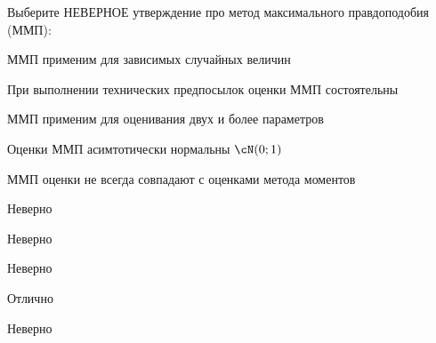 
\begin{question}
Выберите НЕВЕРНОЕ утверждение про метод максимального правдоподобия
(ММП):
\begin{answerlist}
  \item ММП применим для зависимых случайных величин
  \item При выполнении технических предпосылок оценки ММП состоятельны
  \item ММП применим для оценивания двух и более параметров
  \item Оценки ММП асимтотически нормальны \(\cN(0;1)\)
  \item ММП оценки не всегда совпадают с оценками метода моментов
\end{answerlist}
\end{question}

\begin{solution}
\begin{answerlist}
  \item Неверно
  \item Неверно
  \item Неверно
  \item Отлично
  \item Неверно
\end{answerlist}
\end{solution}


